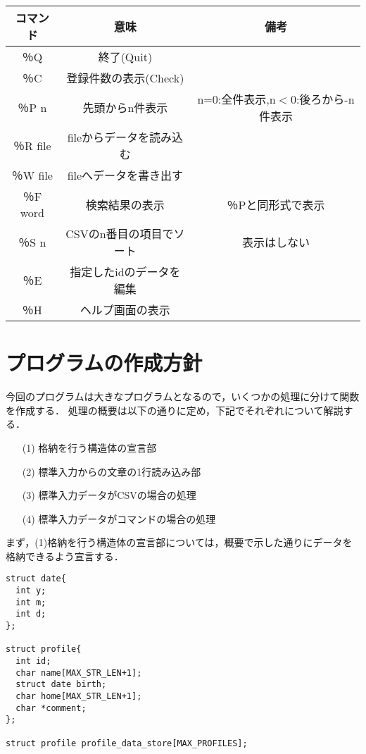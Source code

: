 \documentclass[a4j]{jarticle}
\begin{document}
\begin{enumerate}
\begin{center}
\begin{tabular}{|c|c|c|}\hline
コマンド&意味&備考\\ \hline
％Q&終了(Quit)&\\ \hline
％C&登録件数の表示(Check)&\\ \hline
％P n&先頭からn件表示&n=0:全件表示,n$<$0:後ろから-n件表示\\ \hline
％R file&fileからデータを読み込む&\\ \hline
％W file&fileへデータを書き出す&\\ \hline
％F word&検索結果の表示&％Pと同形式で表示\\ \hline
％S n&CSVのn番目の項目でソート&表示はしない\\ \hline
％E&指定したidのデータを編集&\\ \hline
％H&ヘルプ画面の表示&\\ \hline
\end{tabular}
\end{center}

\end{enumerate}


%
%

\section{プログラムの作成方針}

今回のプログラムは大きなプログラムとなるので，いくつかの処理に分けて関数を作成する．
処理の概要は以下の通りに定め，下記でそれぞれについて解説する．
\begin{itemize}
\item[(1)]格納を行う構造体の宣言部
\item[(2)]標準入力からの文章の1行読み込み部
\item[(3)]標準入力データがCSVの場合の処理
\item[(4)]標準入力データがコマンドの場合の処理
\end{itemize}

まず，(1)格納を行う構造体の宣言部については，概要で示した通りにデータを格納できるよう宣言する．

{\baselineskip 3mm
\begin{verbatim}
struct date{
  int y;
  int m;
  int d;
};

struct profile{
  int id;
  char name[MAX_STR_LEN+1];
  struct date birth;
  char home[MAX_STR_LEN+1];
  char *comment;
};

struct profile profile_data_store[MAX_PROFILES];
\end{verbatim}
}
\end{document}
